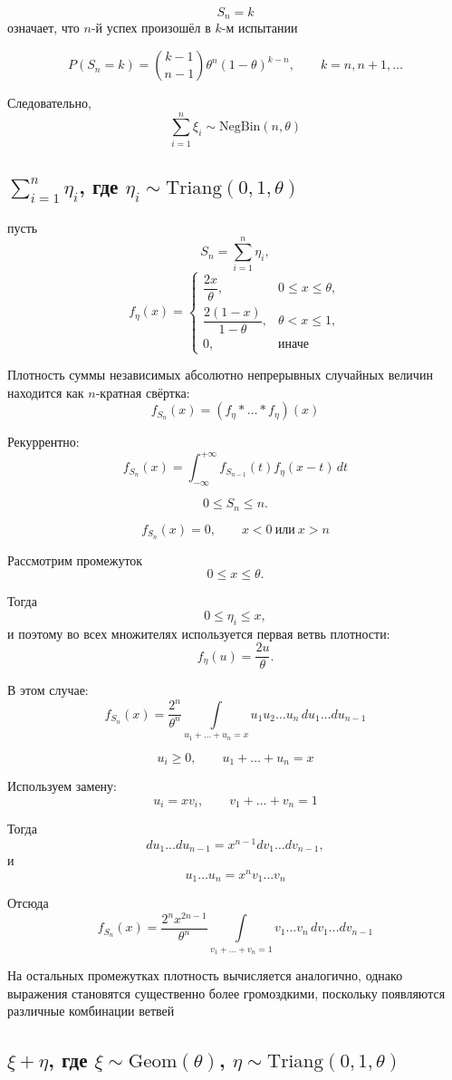 \documentclass[12pt,a4paper]{article}
\theoremstyle{definition}
\begin{document}
\[S_n=k\]
означает, что $n$-й успех произошёл в $k$-м испытании

\[P(S_n=k)=
\binom{k-1}{n-1}
\theta^n(1-\theta)^{k-n},
\qquad k=n,n+1,\dots\]

Следовательно,
\[\boxed{
\sum_{i=1}^{n}\xi_i\sim
\mathrm{NegBin}(n,\theta)}\]

\subsection{\texorpdfstring
{$\sum_{i=1}^{n}\eta_i$, где $\eta_i\sim \mathrm{Triang}(0,1,\theta)$}
{sum eta_i, где eta_i ~ Triang(0,1,theta)}}
пусть
\[S_n=\sum_{i=1}^{n}\eta_i,\]
\[f_\eta(x)=
\begin{cases}
\dfrac{2x}{\theta}, & 0\le x\le\theta,\\[1ex]
\dfrac{2(1-x)}{1-\theta}, & \theta<x\le1,\\[1ex]
0, & \text{иначе}\end{cases}\]

Плотность суммы независимых абсолютно непрерывных случайных величин находится как $n$-кратная свёртка:
\[f_{S_n}(x)=(f_\eta*\dots*f_\eta)(x)\]

Рекуррентно:
\[f_{S_n}(x)
=
\int_{-\infty}^{+\infty}
f_{S_{n-1}}(t)
f_\eta(x-t)\,dt\]

\[0\le S_n\le n.\]

\[f_{S_n}(x)=0,\qquad x<0 \ \text{или}\ x>n\]

Рассмотрим промежуток
\[
0\le x\le\theta.
\]

Тогда
\[0\le \eta_i\le x,\]
и поэтому во всех множителях используется первая ветвь плотности:
\[f_\eta(u)=\frac{2u}{\theta}.\]

В этом случае:
\[
f_{S_n}(x)=
\frac{2^n}{\theta^n}
\int\limits_{u_1+\dots+u_n=x}
u_1u_2\dots u_n
\,du_1\dots du_{n-1}\]

\[u_i\ge0,
\qquad
u_1+\dots+u_n=x\]

Используем замену:
\[u_i=xv_i,
\qquad
v_1+\dots+v_n=1\]

Тогда
\[du_1\dots du_{n-1}=x^{n-1}dv_1\dots dv_{n-1},\] и
\[u_1\dots u_n=x^n v_1\dots v_n \]

Отсюда
\[
\boxed{
f_{S_n}(x)
=
\frac{2^n x^{2n-1}}{\theta^n}
\int\limits_{v_1+\dots+v_n=1}
v_1\dots v_n\,dv_1\dots dv_{n-1}}\]

На остальных промежутках плотность вычисляется аналогично, однако выражения становятся существенно более громоздкими, поскольку появляются различные комбинации ветвей

\subsection{\texorpdfstring
{$\xi+\eta$, где $\xi\sim \mathrm{Geom}(\theta)$, $\eta\sim \mathrm{Triang}(0,1,\theta)$}
{xi+eta, где xi ~ Geom(theta), eta ~ Triang(0,1,theta)}}
\end{document}
